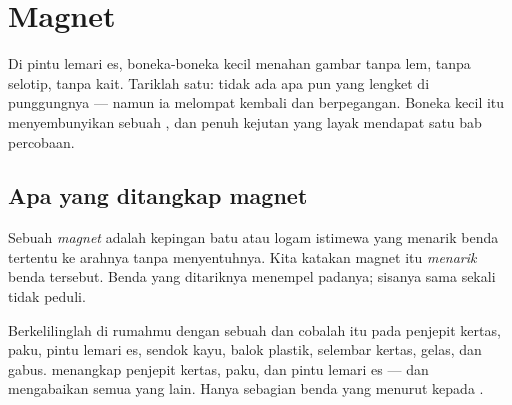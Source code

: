 \chapter{Magnet}\label{ch:g1:magnets}

Di pintu lemari es, boneka-boneka kecil menahan gambar tanpa lem,
tanpa selotip, tanpa kait. Tariklah satu: tidak ada apa pun yang
lengket di punggungnya --- namun ia melompat kembali dan berpegangan.
Boneka kecil itu menyembunyikan sebuah , dan  penuh
kejutan yang layak mendapat satu bab percobaan.

\section{Apa yang ditangkap magnet}

\begin{definition}[Magnet]\label{def:g1:magnets:magnet}
Sebuah \emph{magnet} adalah kepingan batu atau logam
istimewa yang menarik benda tertentu ke arahnya tanpa menyentuhnya.
Kita katakan magnet itu \emph{menarik} benda tersebut.
Benda yang ditariknya menempel padanya; sisanya sama sekali tidak
peduli.
\end{definition}

\begin{example}\label{ex:g1:magnets:test}
Berkelilinglah di rumahmu dengan sebuah  dan cobalah  itu
pada penjepit kertas, paku, pintu lemari es, sendok kayu, balok
plastik, selembar kertas, gelas, dan gabus.  menangkap penjepit
kertas, paku, dan pintu lemari es --- dan mengabaikan semua yang lain. Hanya
sebagian benda yang menurut kepada .
\end{example}

